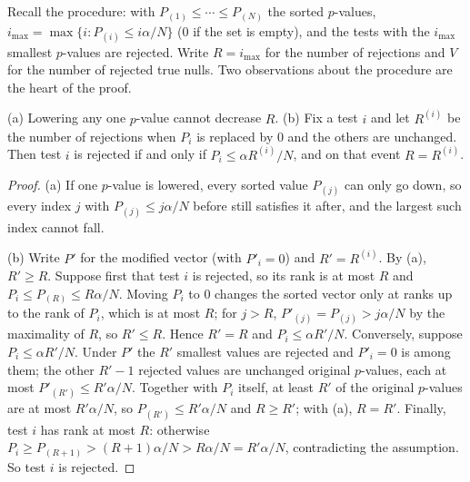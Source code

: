 Recall the procedure: with $P_{(1)} \leq \cdots \leq P_{(N)}$ the sorted $p$-values, $i_{\max} = \max\{i : P_{(i)} \leq i\alpha/N\}$ ($0$ if the set is empty), and the tests with the $i_{\max}$ smallest $p$-values are rejected.
Write $R = i_{\max}$ for the number of rejections and $V$ for the number of rejected true nulls.
Two observations about the procedure are the heart of the proof.

\begin{lemma}
\label{lem:bh-monotone}
(a) Lowering any one $p$-value cannot decrease $R$.
(b) Fix a test $i$ and let $R^{(i)}$ be the number of rejections when $P_i$ is replaced by $0$ and the others are unchanged. Then test $i$ is rejected if and only if $P_i \leq \alpha R^{(i)}/N$, and on that event $R = R^{(i)}$.
\end{lemma}
\begin{proof}
(a) If one $p$-value is lowered, every sorted value $P_{(j)}$ can only go down, so every index $j$ with $P_{(j)} \leq j\alpha/N$ before still satisfies it after, and the largest such index cannot fall.

(b) Write $P'$ for the modified vector (with $P'_i = 0$) and $R' = R^{(i)}$.
By (a), $R' \geq R$.
Suppose first that test $i$ is rejected, so its rank is at most $R$ and $P_i \leq P_{(R)} \leq R\alpha/N$.
Moving $P_i$ to $0$ changes the sorted vector only at ranks up to the rank of $P_i$, which is at most $R$; for $j > R$, $P'_{(j)} = P_{(j)} > j\alpha/N$ by the maximality of $R$, so $R' \leq R$.
Hence $R' = R$ and $P_i \leq \alpha R'/N$.
Conversely, suppose $P_i \leq \alpha R'/N$.
Under $P'$ the $R'$ smallest values are rejected and $P'_i = 0$ is among them; the other $R' - 1$ rejected values are unchanged original $p$-values, each at most $P'_{(R')} \leq R'\alpha/N$.
Together with $P_i$ itself, at least $R'$ of the original $p$-values are at most $R'\alpha/N$, so $P_{(R')} \leq R'\alpha/N$ and $R \geq R'$; with (a), $R = R'$.
Finally, test $i$ has rank at most $R$: otherwise $P_i \geq P_{(R+1)} > (R+1)\alpha/N > R\alpha/N = R'\alpha/N$, contradicting the assumption.
So test $i$ is rejected.
\end{proof}


